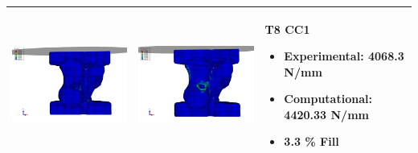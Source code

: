\documentclass[11pt,a4paper]{article}
\begin{document}
\begin{landscape}
\begin{longtable}{|m{11cm}|m{11cm}|m{4cm}|}
\includegraphics[width=10cm]{images/T8_CC1_postVP_Interface_ABAQUS_All_Side_Stress.png}   & \includegraphics[width=10cm]{images/T8_CC1_postVP_Interface_ABAQUS_All_Side_Strain.png}   & T8 CC1  \begin{itemize} \item Experimental: 	4068.3	N/mm \item Computational:	4420.33
 N/mm \item 3.3 \% Fill \end{itemize} \\ \hline 

\end{longtable}
\end{landscape}
\end{document}
